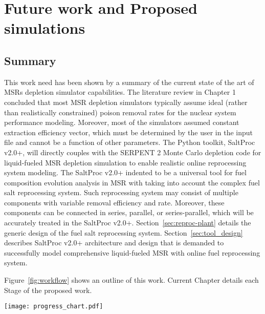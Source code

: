 \chapter[Future work and Proposed simulations]{Future work and Proposed 
simulations}

\section{Summary}
This work need has been shown by a summary of the current state of the 
art of \glspl{MSR} depletion simulator capabilities. The literature review in 
Chapter 1 concluded that most \gls{MSR} depletion simulators typically assume 
ideal (rather than realistically constrained) poison removal rates for the 
nuclear system performance modeling. Moreover, most of the simulators assumed 
constant extraction efficiency vector, which must be determined by the user in 
the input file and cannot be a function of other parameters. The Python 
toolkit, SaltProc v2.0+, will directly couples with the SERPENT 2 Monte Carlo 
depletion code for liquid-fueled \gls{MSR} depletion simulation to enable 
realistic online reprocessing system modeling. The SaltProc v2.0+ indented to 
be a universal tool for fuel composition evolution analysis in \gls{MSR} with 
taking into account the complex fuel salt reprocessing system. Such 
reprocessing system may consist of multiple components with variable removal 
efficiency and rate. Moreover, these components can be connected in series, 
parallel, or series-parallel, which will be accurately treated in the SaltProc 
v2.0+. Section~\ref{sec:reproc-plant} details the generic design of the fuel 
salt reprocessing system. Section~\ref{sec:tool_design} describes SaltProc 
v2.0+ architecture and design that is demanded to successfully model 
comprehensive liquid-fueled \gls{MSR} with online fuel reprocessing system. 

Figure~\ref{fig:workflow} shows an outline of this work. Current  
Chapter details each Stage of the proposed work.
 \begin{sidewaysfigure}[ht!] %
 	\centering
 	\texttt{[image: progress\_chart.pdf]} 
 	\caption{Workflow for the simulations proposed in this work.}
 	\label{fig:workflow}
 \end{sidewaysfigure}
 \FloatBarrier
 
 
